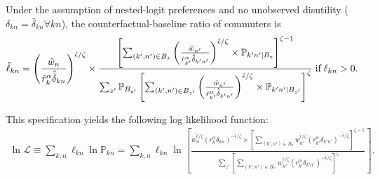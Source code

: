 \documentclass[11pt]{article}
\theoremstyle{definition}
\begin{document}
Under the assumption of nested-logit preferences and no unobserved disutility ($\delta_{kn}=\bar{\delta}_{kn} \forall kn$),
the counterfactual-baseline ratio of commuters is
\begin{align*}
  \hat{\ell}_{kn} 
  = 
  \left( 
    \frac{
      \hat{w}_n
    }{
      \hat{r}_k^\alpha \hat{\bar{\delta}}_{kn}
    }
  \right)^{\mathring{\epsilon}/\zeta} \times
  \frac{%
    \left[ 
      \sum_{(k',n') \in B_z} \left(\frac{\hat{w}_{n'}}{\hat{r}_{k'}^\alpha \hat{\bar{\delta}}_{k'n'}}\right)^{\mathring{\epsilon}/\zeta} \times \mathbb{P}_{k'n'|B_z} 
    \right]^{\zeta - 1}
  }{%
    \sum_{z'} \mathbb{P}_{B_{z'}}
    \left[ 
      \sum_{(k',n') \in B_{z'}} \left(\frac{\hat{w}_{n'}}{\hat{r}_{k'}^\alpha \hat{\bar{\delta}}_{k'n'}}\right)^{\mathring{\epsilon}/\zeta} \times \mathbb{P}_{k'n'| B_{z'}} 
    \right]^{\zeta} 
  } \; \text{if} \; \ell_{kn}>0
.\end{align*}


This specification yields the following log likelihood function:
\begin{align*}
    \ln \mathcal{L}
    \equiv
    \sum_{k,n} \ell_{kn}  \ln \mathbb{P}_{kn}
    =
    \sum_{k,n} \ell_{kn}
    \ln
    \left[
       \frac{ 
        w_n^{\mathring{\epsilon}/\zeta}(r_k^\alpha \delta_{kn})^{-\mathring{\epsilon}/\zeta} 
        \times 
        \left[ \sum_{(k',n')\in B_z} w_{n'}^{\mathring{\epsilon}/\zeta} \left( r_{k'}^\alpha \delta_{k'n'} \right)^{-\mathring{\epsilon}/\zeta} \right]^{\zeta-1}
        }{
         \sum_{z'} \left[ \sum_{(k',n')\in B_{z'}}  w_{n'}^{\mathring{\epsilon}/\zeta} \left( r_{k'}^\alpha \delta_{k'n'} \right)^{-\mathring{\epsilon}/\zeta} \right]^{\zeta}
        }
    \right].
\end{align*}
\end{document}
